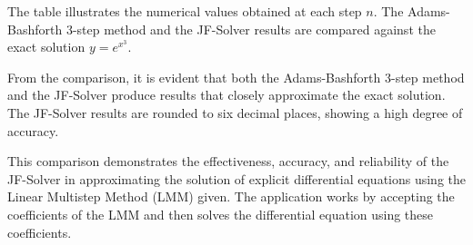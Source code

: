 The table illustrates the numerical values obtained at each step $n$. The Adams-Bashforth 3-step method and the JF-Solver results are compared against the exact solution $y = e^{x^3}$.

From the comparison, it is evident that both the Adams-Bashforth 3-step method and the JF-Solver produce results that closely approximate the exact solution. The JF-Solver results are rounded to six decimal places, showing a high degree of accuracy.

This comparison demonstrates the effectiveness, accuracy, and reliability of the JF-Solver in approximating the solution of explicit differential equations using the Linear Multistep Method (LMM) given. The application works by accepting the coefficients of the LMM and then solves the differential equation using these coefficients.








